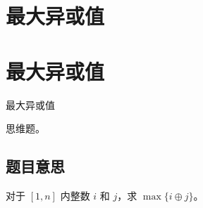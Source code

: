\def\sectionName{最大异或值}



\isBeamerMode\relax
    \section[\TOCName]{\sectionName}
\fi
\isBeamerMode\relax
    \section[\TOCName\ -\ \sectionName]{\sectionName}
\fi

\begin{frame}

\isBeamerMode\relax
    {\Huge \sectionName}\par
\fi




思维题。



\end{frame}

\subsection{题目意思}
\begin{frame} %
对于 $[1, n]$ 内整数 $i$ 和 $j$，求 $\max\{i \oplus j\}$。
\end{frame}



